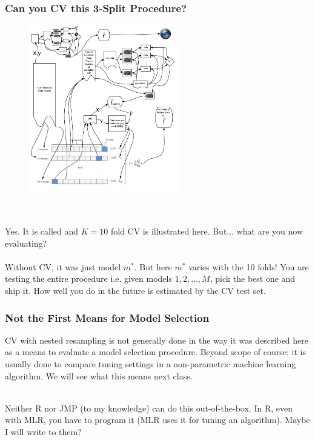 \documentclass[handout]{beamer}
\begin{document}
\begin{frame}\frametitle{Can you CV this 3-Split Procedure?}

\pause

\begin{minipage}{0.6\textwidth}
\begin{figure}
\centering
\includegraphics[width=2.56in]{nested_resampling}
\end{figure}
\end{minipage}~
\begin{minipage}{0.35\textwidth}
\small
Yes. It is called  and $K=10$ fold CV is illustrated here. But... \pause what are you now evaluating? \\~\\

\pause Without CV, it was just model $m^*$. But here $m^*$ varies with the 10 folds! \pause You are testing the entire procedure i.e. given models $1, 2, \ldots, M$, pick the best one and ship it. How well you do in the future is estimated by the CV test set.
\end{minipage}


	
\end{frame}



\begin{frame}\frametitle{Not the First Means for Model Selection}

CV with nested resampling is not generally done in the way it was described here as a means to evaluate a model selection procedure. \pause Beyond scope of course: it is usually done to compare tuning settings in a non-parametric machine learning algorithm. We will see what this means next class. \\~\\ \pause

Neither R nor JMP (to my knowledge) can do this out-of-the-box. In R, even with MLR, you have to program it (MLR uses it for tuning an algorithm). Maybe I will write to them?
	
\end{frame}
\end{document}
